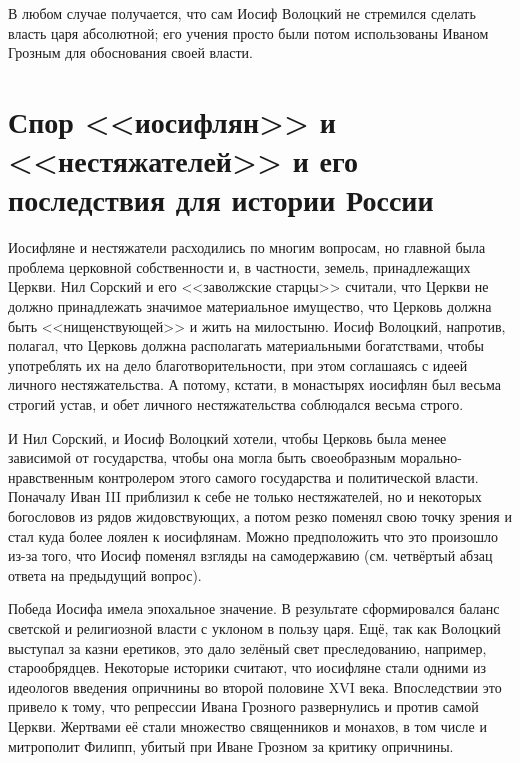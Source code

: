 \documentclass[12pt]{article}
\begin{document}
  В любом случае получается, что сам Иосиф Волоцкий не стремился сделать власть царя абсолютной;
  его учения просто были потом использованы Иваном Грозным для обоснования своей власти.

  \section{Спор <<иосифлян>> и <<нестяжателей>> и его последствия для истории России}

  Иосифляне и нестяжатели расходились по многим вопросам,
  но главной была проблема церковной собственности и, в частности, земель, принадлежащих Церкви.
  Нил Сорский\footnotemark{} и его <<заволжские старцы>> считали, что Церкви не должно принадлежать значимое материальное имущество,
  что Церковь должна быть <<нищенствующей>> и жить на милостыню.
  Иосиф Волоцкий, напротив, полагал, что Церковь должна располагать материальными богатствами,
  чтобы употреблять их на дело благотворительности, при этом соглашаясь с идеей личного нестяжательства.
  А потому, кстати, в монастырях иосифлян был весьма строгий устав, и обет личного нестяжательства соблюдался весьма строго.


  И Нил Сорский, и Иосиф Волоцкий хотели, чтобы Церковь была менее зависимой от государства,
  чтобы она могла быть своеобразным морально-нравственным контролером этого самого государства и политической власти.
  Поначалу Иван III\footnotemark{} приблизил к себе не только нестяжателей, но и некоторых богословов из рядов жидовствующих\footnotemark{},
  а потом резко поменял свою точку зрения и стал куда более лоялен к иосифлянам.
  Можно предположить что это произошло из-за того, что Иосиф поменял взгляды на самодержавию (см. четвёртый абзац ответа на предыдущий вопрос).

  \addtocounter{footnote}{-2}

  Победа Иосифа имела эпохальное значение.
  В результате сформировался баланс светской и религиозной власти с уклоном в пользу царя.
  Ещё, так как Волоцкий выступал за казни еретиков, это дало зелёный свет преследованию, например, старообрядцев.
  Некоторые историки считают, что иосифляне стали одними из идеологов введения опричнины во второй половине XVI века.
  Впоследствии это привело к тому, что репрессии Ивана Грозного развернулись и против самой Церкви.
  Жертвами её стали множество священников и монахов, в том числе и митрополит Филипп,
  убитый при Иване Грозном за критику опричнины.
\end{document}
